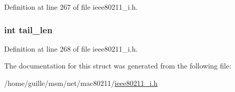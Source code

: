 Definition at line 267 of file ieee80211\-\_\-i.\-h.

\hypertarget{structbeacon__data_a7e0d46a3d87c9fed4f5a67e933849488}{
\subsubsection[{tail\-\_\-len}]{\setlength{\rightskip}{0pt plus 5cm}int tail\-\_\-len}}\label{structbeacon__data_a7e0d46a3d87c9fed4f5a67e933849488}


Definition at line 268 of file ieee80211\-\_\-i.\-h.



The documentation for this struct was generated from the following file\-:\begin{DoxyCompactItemize}
\item 
/home/guille/msm/net/mac80211/\hyperlink{ieee80211__i_8h}{ieee80211\-\_\-i.\-h}\end{DoxyCompactItemize}
